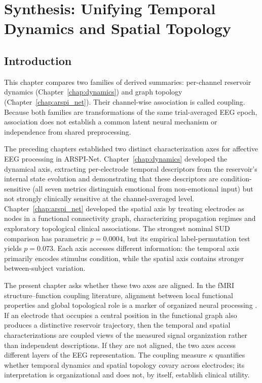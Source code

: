 \chapter{Synthesis: Unifying Temporal Dynamics and Spatial Topology}
\label{chap:synthesis}

\section{Introduction}
\label{sec:ch7_intro}

This chapter compares two families of derived summaries: per-channel reservoir dynamics (Chapter~\ref{chap:dynamics}) and graph topology (Chapter~\ref{chap:arspi_net}). Their channel-wise association is called coupling. Because both families are transformations of the same trial-averaged EEG epoch, association does not establish a common latent neural mechanism or independence from shared preprocessing.

The preceding chapters established two distinct characterization axes for affective EEG processing in ARSPI-Net. Chapter~\ref{chap:dynamics} developed the dynamical axis, extracting per-electrode temporal descriptors from the reservoir's internal state evolution and demonstrating that these descriptors are condition-sensitive (all seven metrics distinguish emotional from non-emotional input) but not strongly clinically sensitive at the channel-averaged level. Chapter~\ref{chap:arspi_net} developed the spatial axis by treating electrodes as nodes in a functional connectivity graph, characterizing propagation regimes and exploratory topological clinical associations. The strongest nominal SUD comparison has parametric $p = 0.0004$, but its empirical label-permutation test yields $p = 0.073$. Each axis accesses different information: the temporal axis primarily encodes stimulus condition, while the spatial axis contains stronger between-subject variation.

The present chapter asks whether these two axes are aligned. In the fMRI structure--function coupling literature, alignment between local functional properties and global topological role is a marker of organized neural processing \cite{Deco2015,honey_network_2007,suarez_linking_2020}. If an electrode that occupies a central position in the functional graph also produces a distinctive reservoir trajectory, then the temporal and spatial characterizations are coupled views of the measured signal organization rather than independent descriptions. If they are not aligned, the two axes access different layers of the EEG representation. The coupling measure $\kappa$ quantifies whether temporal dynamics and spatial topology covary across electrodes; its interpretation is organizational and does not, by itself, establish clinical utility.

